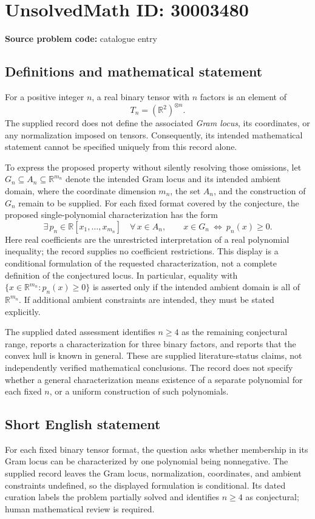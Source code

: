 \documentclass[11pt]{article}
\newcommand{\R}{\mathbb{R}}
\begin{document}
\section*{UnsolvedMath ID: 30003480}
\textbf{Source problem code:} catalogue entry
\subsection{Definitions and mathematical statement}
For a positive integer \(n\), a real binary tensor with \(n\) factors is an element of
\[
T_n=(\R^2)^{\otimes n}.
\]
The supplied record does not define the associated \emph{Gram locus}, its coordinates, or any normalization imposed on tensors. Consequently, its intended mathematical statement cannot be specified uniquely from this record alone.

To express the proposed property without silently resolving those omissions, let \(G_n\subseteq A_n\subseteq\R^{m_n}\) denote the intended Gram locus and its intended ambient domain, where the coordinate dimension \(m_n\), the set \(A_n\), and the construction of \(G_n\) remain to be supplied. For each fixed format covered by the conjecture, the proposed single-polynomial characterization has the form
\[
\exists\,p_n\in\R[x_1,\ldots,x_{m_n}]\quad
\forall\,x\in A_n,\qquad
x\in G_n\ \Longleftrightarrow\ p_n(x)\geq 0.
\]
Here real coefficients are the unrestricted interpretation of a real polynomial inequality; the record supplies no coefficient restrictions. This display is a conditional formulation of the requested characterization, not a complete definition of the conjectured locus. In particular, equality with \(\{x\in\R^{m_n}:p_n(x)\geq0\}\) is asserted only if the intended ambient domain is all of \(\R^{m_n}\). If additional ambient constraints are intended, they must be stated explicitly.

The supplied dated assessment identifies \(n\geq4\) as the remaining conjectural range, reports a characterization for three binary factors, and reports that the convex hull is known in general. These are supplied literature-status claims, not independently verified mathematical conclusions. The record does not specify whether a general characterization means existence of a separate polynomial for each fixed \(n\), or a uniform construction of such polynomials.
\subsection{Short English statement}
For each fixed binary tensor format, the question asks whether membership in its Gram locus can be characterized by one polynomial being nonnegative. The supplied record leaves the Gram locus, normalization, coordinates, and ambient constraints undefined, so the displayed formulation is conditional. Its dated curation labels the problem partially solved and identifies \(n\geq4\) as conjectural; human mathematical review is required.
\end{document}
